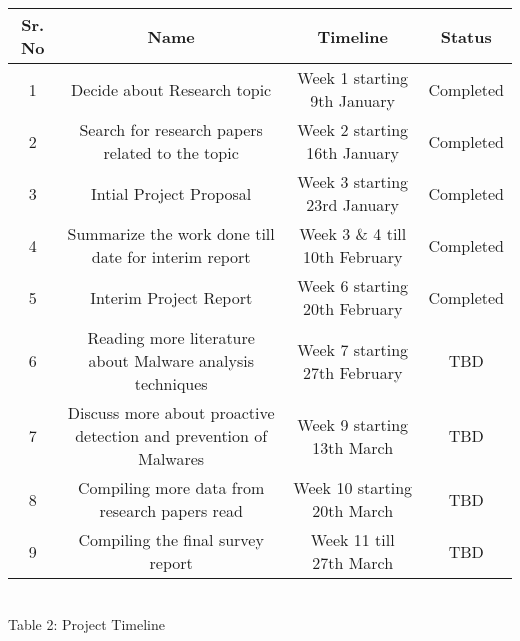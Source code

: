 \documentclass[11pt]{article}
\begin{document}
	\begin{center}
		\begin{tabular}{cccc}
			\hline
			Sr. No & Name & Timeline & Status\\
			\hline
			1 & Decide about Research topic  & Week 1 starting 9th January & Completed\\
			\hline
			2 & Search for research papers related to the topic & Week 2 starting 16th January & Completed\\
			\hline
			3 & Intial Project Proposal & Week 3 starting 23rd January & Completed\\
			\hline
			4 & Summarize the work done till date for interim report & Week 3 \& 4 till 10th February & Completed\\
			\hline
			5 & Interim Project Report  & Week 6 starting 20th February  & Completed\\
			\hline
			6 & Reading more literature about Malware analysis techniques & Week 7 starting 27th February & TBD\\
			\hline
			7 & Discuss more about proactive detection and prevention of Malwares & Week 9 starting 13th March & TBD\\
			\hline
			8 & Compiling more data from research papers read & Week 10 starting 20th March & TBD\\
			\hline
			9 & Compiling the final survey report & Week 11 till 27th March & TBD\\
			\hline
		\end{tabular}\\
	\caption{Table 2: Project Timeline} \label{table: Project Timeline}
	\end{center}


\end{document}
